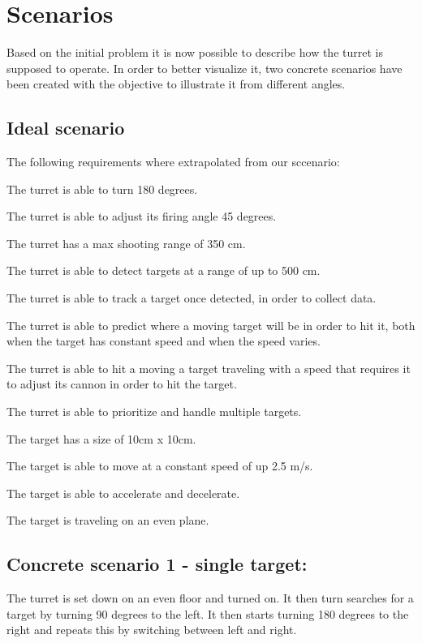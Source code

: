 \section{Scenarios}

Based on the initial problem it is now possible to describe how the turret is
supposed to operate. In order to better visualize it, two concrete scenarios
have been created with the objective to illustrate it from different angles.

\subsection{Ideal scenario}

The following requirements where extrapolated from our sccenario:\nl

The turret is able to turn 180 degrees.\nl

The turret is able to adjust its firing angle 45 degrees.\nl
 
The turret has a max shooting range of 350 cm.\nl

The turret is able to detect targets at a range of up to 500 cm.\nl

The turret is able to track a target once detected, in order to collect data.\nl

The turret is able to predict where a moving target will be in order to hit it,
both when the target has constant speed and when the speed varies.\nl

The turret is able to hit a moving a target traveling with a speed that
requires it to adjust its cannon in order to hit the target.\nl

The turret is able to prioritize and handle multiple targets.\nl

The target has a size of 10cm x 10cm.\nl

The target is able to move at a constant speed of up 2.5 m/s.\nl

The target is able to accelerate and decelerate.\nl

The target is traveling on an even plane.\nl



\subsection{Concrete scenario 1 - single target:}
The turret is set down on an even floor and turned on. It then turn searches
for a target by turning 90 degrees to the left. It then starts turning 180
degrees to the right and repeats this by switching between left and right.\nl

